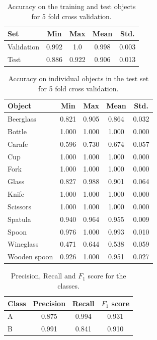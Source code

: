 \begin{table}
	\centering
	\begin{tabular}{l | c | c | c | c}
		\hline
		Set        & Min   & Max   & Mean  & Std.  \\ \hline
		Validation & 0.992 & 1.0   & 0.998 & 0.003 \\
		Test       & 0.886 & 0.922 & 0.906 & 0.013 \\
		\hline
	\end{tabular}
	\caption{Accuracy on the training and test objects for 5 fold cross validation.}
	\label{tab:results_accuracy}
\end{table}

\begin{table}
	\centering
	\begin{tabular}{l | c | c | c | c}
		\hline
		Object       & Min   & Max   & Mean  & Std.  \\ \hline
		Beerglass    & 0.821 & 0.905 & 0.864 & 0.032 \\
		Bottle       & 1.000 & 1.000 & 1.000 & 0.000 \\
		Carafe       & 0.596 & 0.730 & 0.674 & 0.057 \\
		Cup          & 1.000 & 1.000 & 1.000 & 0.000 \\
		Fork         & 1.000 & 1.000 & 1.000 & 0.000 \\
		Glass        & 0.827 & 0.988 & 0.901 & 0.064 \\
		Knife        & 1.000 & 1.000 & 1.000 & 0.000 \\
		Scissors     & 1.000 & 1.000 & 1.000 & 0.000 \\
		Spatula      & 0.940 & 0.964 & 0.955 & 0.009 \\
		Spoon        & 0.976 & 1.000 & 0.993 & 0.010 \\
		Wineglass    & 0.471 & 0.644 & 0.538 & 0.059 \\
		Wooden spoon & 0.926 & 1.000 & 0.951 & 0.027 \\
		\hline
	\end{tabular}
	\caption{Accuracy on individual objects in the test set for 5 fold cross validation.}
	\label{tab:results}
\end{table}

\begin{table}
	\centering
	\begin{tabular}{l | c | c | c}
		\hline
		Class & Precision & Recall & \(F_1\) score \\ \hline
		A     & 0.875     & 0.994  & 0.931 \\
		B     & 0.991     & 0.841  & 0.910 \\ \hline
	\end{tabular}
	\caption{Precision, Recall and \(F_1\) score for the classes.}
	\label{tab:results_precision_recall_f1}
\end{table}


